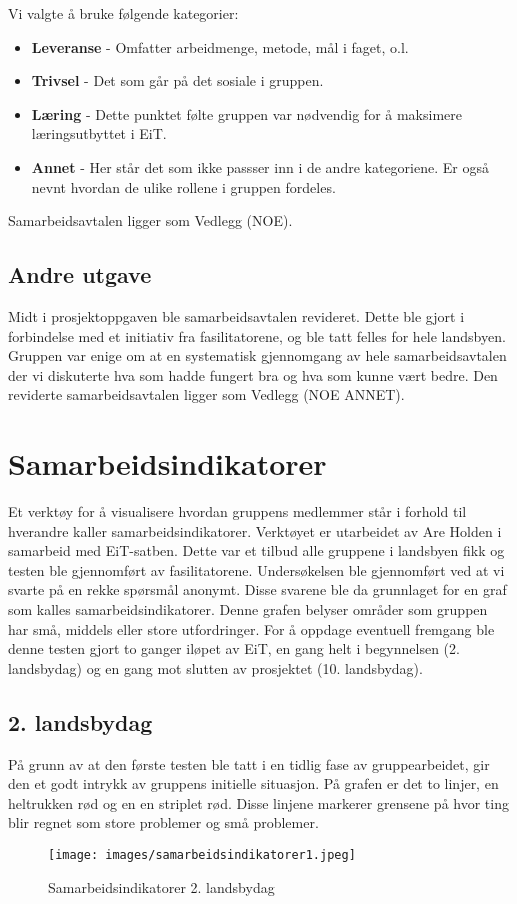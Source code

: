 Vi valgte å bruke følgende kategorier:
\begin{itemize}
    \item \textbf{Leveranse} - Omfatter arbeidmenge, metode, mål i faget, o.l.
    \item \textbf{Trivsel} - Det som går på det sosiale i gruppen. 
    \item \textbf{Læring} - Dette punktet følte gruppen var nødvendig for å maksimere læringsutbyttet i EiT. 
    \item \textbf{Annet} - Her står det som ikke passser inn i de andre kategoriene. Er også nevnt hvordan de ulike rollene i gruppen fordeles. 
\end{itemize}
Samarbeidsavtalen ligger som Vedlegg (NOE). 

\subsection{Andre utgave}
Midt i prosjektoppgaven ble samarbeidsavtalen revideret. 
Dette ble gjort i forbindelse med et initiativ fra fasilitatorene, og ble tatt felles for hele landsbyen. 
Gruppen var enige om at en systematisk gjennomgang av hele samarbeidsavtalen der vi diskuterte hva som hadde fungert bra og hva som kunne vært bedre. 
\vspace{\secspace}
Den reviderte samarbeidsavtalen ligger som Vedlegg (NOE ANNET).  

\section{Samarbeidsindikatorer}
Et verktøy for å visualisere hvordan gruppens medlemmer står i forhold til hverandre kaller samarbeidsindikatorer. 
Verktøyet er utarbeidet av Are Holden i samarbeid med EiT-satben. 
Dette var et tilbud alle gruppene i landsbyen fikk og testen ble gjennomført av fasilitatorene. 
Undersøkelsen ble gjennomført ved at vi svarte på en rekke spørsmål anonymt. 
Disse svarene ble da grunnlaget for en graf som kalles samarbeidsindikatorer. 
Denne grafen belyser områder som gruppen har små, middels eller store utfordringer. 
For å oppdage eventuell fremgang ble denne testen gjort to ganger iløpet av EiT, en gang helt i begynnelsen (2. landsbydag) og en gang mot slutten av prosjektet (10. landsbydag). 

\subsection{2. landsbydag}
På grunn av at den første testen ble tatt i en tidlig fase av gruppearbeidet, gir den et godt intrykk av gruppens initielle situasjon. 
På grafen er det to linjer, en heltrukken rød og en en striplet rød. 
Disse linjene markerer grensene på hvor ting blir regnet som store problemer og små problemer. 
\begin{figure}[H]
    \centering
    \texttt{[image: images/samarbeidsindikatorer1.jpeg]}	
    \caption{Samarbeidsindikatorer 2. landsbydag}
    \label{fig:sam1}
\end{figure}

